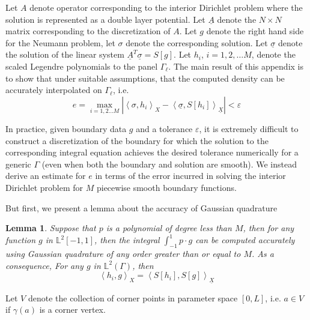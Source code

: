 \documentclass[12pt,times]{elsarticle}
\newcommand{\uA}{\underline{A}}
\newcommand{\usigma}{\underline{\sigma}}
\newcommand{\uX}{\underline{X}}
\newtheorem{lem}{Lemma}
\begin{document}
{\color{blue}
Let $A$ denote operator corresponding to the interior Dirichlet problem where the solution is represented as a double layer potential. Let $\underline{A}$ denote the $N\times N$ matrix corresponding to the discretization of $A$. Let $g$ denote the
right hand side for the Neumann problem, let $\sigma$ denote the corresponding solution.   Let $\underline{\sigma}$ denote the solution of the linear system $\uA^{T} \usigma = S[g]$. Let $h_{i}$, $i=1,2,\ldots M$, denote the scaled Legendre polynomials to the panel $\Gamma_{\ell}$.
The main result of this appendix is to show that under suitable assumptions, that the computed density can be accurately interpolated on $\Gamma_{\ell}$, i.e.  
\begin{equation}
e = \max_{i=1,2\ldots M} |\left< \sigma, h_{i} \right>_{X} -  \left< \usigma, S[h_{i}] \right>_{\uX}| < \varepsilon  
\end{equation}

In practice, given boundary data $g$ and a tolerance $\varepsilon$, it is extremely difficult to construct a discretization of the boundary for which the solution to the corresponding integral equation achieves the desired tolerance numerically for a generic $\Gamma$ (even when both the boundary and solution are smooth). 
We instead derive an estimate for $e$ in terms of the error incurred in solving the interior Dirichlet problem for $M$ piecewise smooth boundary functions. 

But first, we present a lemma about the accuracy of Gaussian quadrature
\begin{lem}
\label{lem:b1}
Suppose that $p$ is a polynomial of degree less than $M$, then for any function $g$ in $\mathbb{L}^{2}[-1,1]$, then the integral
$\int_{-1}^{1} p \cdot g$ can be computed accurately using Gaussian quadrature of any order greater than or equal to $M$.
As a consequence, For any $g$ in $\mathbb{L}^{2}(\Gamma)$, then 
\begin{equation}
\left<h_{i},g \right>_{X} = \left< S[h_{i}], S[g] \right>_{\uX}
\end{equation}
\end{lem}

Let $V$ denote the collection of corner points in parameter space $[0,L]$, i.e. $a \in V$ if $\gamma(a)$ is a corner vertex.

}
\end{document}
